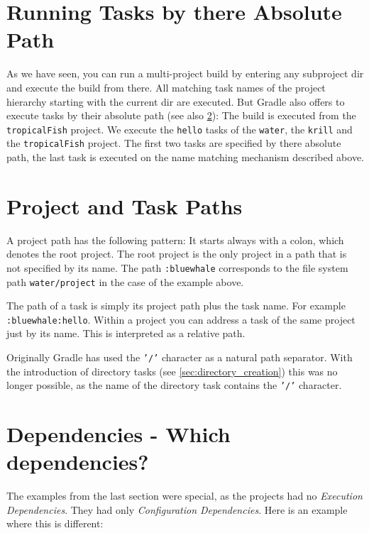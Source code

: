 \section{Running Tasks by there Absolute Path} %
\label{sec:running_partial_build_from_the_root}
As we have seen, you can run a multi-project build by entering any subproject dir and execute the build from there. All matching task names of the project hierarchy starting with the current dir are executed. But Gradle also offers to execute tasks by their absolute path (see also \ref{sec:project_and_task_paths}): 
The build is executed from the \texttt{tropicalFish} project. We execute the \texttt{hello} tasks of the \texttt{water}, the \texttt{krill} and the \texttt{tropicalFish} project. The first two tasks are specified by there absolute path, the last task is executed on the name matching mechanism described above.

\section{Project and Task Paths} %
\label{sec:project_and_task_paths}
A project path has the following pattern: It starts always with a colon, which denotes the root project. The root project is the only project in a path that is not specified by its name. The path \texttt{:bluewhale} corresponds to the file system path \texttt{water/project} in the case of the example above.

The path of a task is simply its project path plus the task name. For example \texttt{:bluewhale:hello}. Within a project you can address a task of the same project just by its name. This is interpreted as a relative path.

Originally Gradle has used the \texttt{'/'} character as a natural path separator. With the introduction of directory tasks (see \ref{sec:directory_creation}) this was no longer possible, as the name of the directory task contains the \texttt{'/'} character.

\section{Dependencies - Which dependencies?} %
\label{sec:dependencies_which_dependencies}
The examples from the last section were special, as the projects had no \emph{Execution Dependencies}. They had only \emph{Configuration Dependencies}. Here is an example where this is different:

